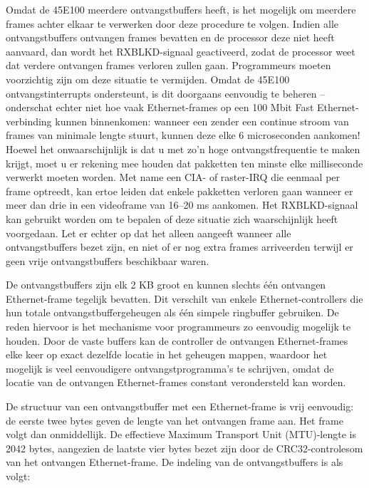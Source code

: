 Omdat de 45E100 meerdere ontvangstbuffers heeft, is het mogelijk om meerdere frames achter elkaar te verwerken door deze procedure te volgen. Indien alle ontvangstbuffers ontvangen frames bevatten en de processor deze niet heeft aanvaard, dan wordt het RXBLKD-signaal geactiveerd, zodat de processor weet dat verdere ontvangen frames verloren zullen gaan. Programmeurs moeten voorzichtig zijn om deze situatie te vermijden. Omdat de 45E100 ontvangstinterrupts ondersteunt, is dit doorgaans eenvoudig te beheren -- onderschat echter niet hoe vaak Ethernet-frames op een 100 Mbit Fast Ethernet-verbinding kunnen binnenkomen: wanneer een zender een continue stroom van frames van minimale lengte stuurt, kunnen deze elke 6 microseconden aankomen! Hoewel het onwaarschijnlijk is dat u met zo'n hoge ontvangstfrequentie te maken krijgt, moet u er rekening mee houden dat pakketten ten minste elke milliseconde verwerkt moeten worden. Met name een CIA- of raster-IRQ die eenmaal per frame optreedt, kan ertoe leiden dat enkele pakketten verloren gaan wanneer er meer dan drie in een videoframe van 16--20 ms aankomen. Het RXBLKD-signaal kan gebruikt worden om te bepalen of deze situatie zich waarschijnlijk heeft voorgedaan. Let er echter op dat het alleen aangeeft wanneer alle ontvangstbuffers bezet zijn, en niet of er nog extra frames arriveerden terwijl er geen vrije ontvangstbuffers beschikbaar waren.

De ontvangstbuffers zijn elk 2 KB groot en kunnen slechts één ontvangen Ethernet-frame tegelijk bevatten. Dit verschilt van enkele Ethernet-controllers die hun totale ontvangstbuffergeheugen als één simpele ringbuffer gebruiken. De reden hiervoor is het mechanisme voor programmeurs zo eenvoudig mogelijk te houden. Door de vaste buffers kan de controller de ontvangen Ethernet-frames elke keer op exact dezelfde locatie in het geheugen mappen, waardoor het mogelijk is veel eenvoudigere ontvangstprogramma's te schrijven, omdat de locatie van de ontvangen Ethernet-frames constant verondersteld kan worden.

De structuur van een ontvangstbuffer met een Ethernet-frame is vrij eenvoudig: de eerste twee bytes geven de lengte van het ontvangen frame aan. Het frame volgt dan onmiddellijk. De effectieve Maximum Transport Unit (MTU)-lengte is 2042 bytes, aangezien de laatste vier bytes bezet zijn door de CRC32-controlesom van het ontvangen Ethernet-frame. De indeling van de ontvangstbuffers is als volgt:

